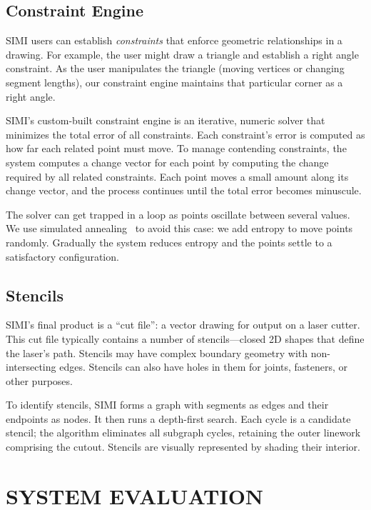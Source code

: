 \documentclass{article}
\begin{document}
\subsection{Constraint Engine}

SIMI users can establish \textit{constraints} that enforce geometric
relationships in a drawing. For example, the user might draw a
triangle and establish a right angle constraint. As the user
manipulates the triangle (moving vertices or changing segment
lengths), our constraint engine maintains that particular corner as a
right angle.

SIMI's custom-built constraint engine is an iterative, numeric solver
that minimizes the total error of all constraints. Each constraint's
error is computed as how far each related point must move. To manage
contending constraints, the system computes a change vector for each
point by computing the change required by all related
constraints. Each point moves a small amount along its change vector,
and the process continues until the total error becomes minuscule.

The solver can get trapped in a loop as points oscillate between
several values. We use simulated annealing~\cite{metropolis-annealing}
to avoid this case: we add entropy to move points randomly. Gradually
the system reduces entropy and the points settle to a satisfactory
configuration.

\subsection{Stencils}

SIMI's final product is a ``cut file'': a vector drawing for output on
a laser cutter. This cut file typically contains a number of
stencils---closed 2D shapes that define the laser's path. Stencils may
have complex boundary geometry with non-intersecting edges. Stencils
can also have holes in them for joints, fasteners, or other purposes.

To identify stencils, SIMI forms a graph with segments as edges and
their endpoints as nodes. It then runs a depth-first search. Each
cycle is a candidate stencil; the algorithm eliminates all subgraph
cycles, retaining the outer linework comprising the cutout. Stencils
are visually represented by shading their interior.

\section{SYSTEM EVALUATION}
\end{document}
